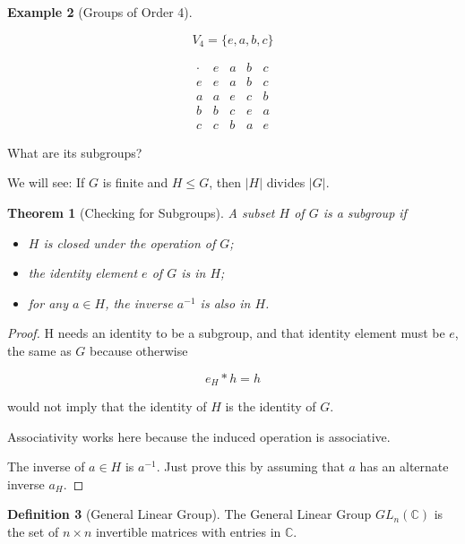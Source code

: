 \documentclass[11pt]{article}
\newcommand{\1}{\mathbf{1}}
\theoremstyle{notestyle}
\newtheorem{theorem}{Theorem}[section]
\theoremstyle{definition}
\newtheorem{definition}[theorem]{Definition}
\newtheorem{example}[theorem]{Example}
\begin{document}
\begin{example}[Groups of Order 4]
\label{ex:order-four}

$$
\boxed{V_4 = \{e,a,b,c\}}
$$

$$
\begin{array}{c|cccc}
\cdot & e & a & b & c \\ \hline
e & e & a & b & c \\
a & a & e & c & b \\
b & b & c & e & a \\
c & c & b & a & e
\end{array}
$$

What are its subgroups?

\par
We will see: If $G$ is finite and $H \le G$, then $|H|$ divides $|G|$.

\begin{theorem}[Checking for Subgroups]
\label{thm:subgroup-test}
A subset $H$ of $G$ is a subgroup if
\begin{itemize}
\item $H$ is closed under the operation of $G$;
\item the identity element $e$ of $G$ is in $H$;
\item for any $a \in H$, the inverse $a^{-1}$ is also in $H$.
\end{itemize}
\end{theorem}

\begin{proof}
H needs an identity to be a subgroup, and that identity element must be $e$, the same as
$G$ because otherwise

$$
e_H * h = h
$$

would not imply that the identity of $H$ is the identity of $G$.

Associativity works here because the induced operation is associative.

The inverse of $a \in H$ is $a^{-1}$. Just prove this by assuming that $a$ has an alternate
inverse $a_H$.
\end{proof}

\end{example}

\begin{definition}[General Linear Group]
\label{def:general-linear-group}
The General Linear Group $GL_n(\mathbb{C})$ is the set of $n \times n$ invertible matrices
with entries in $\mathbb{C}$.
\end{definition}
\end{document}
